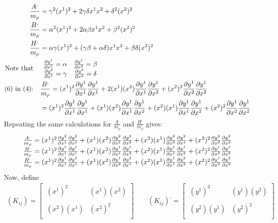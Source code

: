 \begin {align}
\ \frac{A^,}{m_{\rho}}  &= \gamma^2 (x^1)^2+2 \gamma \delta x^1 x^2 + \delta ^2 (x^2)^2\\
\  \frac{B^,}{m_{\rho}}  &= \alpha^2 (x^1)^2+2 \alpha \beta x^1 x^2 + \beta ^2 (x^2)^2\\
\  \frac{H^,}{m_{\rho}}  &= \alpha \gamma (x^1)^2 + (\gamma \beta + \alpha \delta) x^1 x^2 + \beta \delta (x^2)^2\\
\text{Note that} \quad &\begin{array}{cc}
  \pdv{y^1}{x^1} = \alpha & \pdv{y^1}{x^2} = \beta\\ 
	\pdv{y^2}{x^1} = \gamma & \pdv{y^2}{x^2} = \delta\\ 
  \end{array}\\
  \text{(6) in  (4):}\quad &\frac{B^,}{m_{\rho}} =  (x^1)^2\pdv{y^1}{x^1} \pdv{y^1}{x^1}  + 2 (x^1)(x^2)\pdv{y^1}{x^1}\pdv{y^1}{x^2} + (x^2)^2\pdv{y^1}{x^2}\pdv{y^1}{x^2}\\
  &=  (x^1)^2\pdv{y^1}{x^1} \pdv{y^1}{x^1}  +  (x^1)(x^2)\pdv{y^1}{x^1}\pdv{y^1}{x^2} + (x^2)(x^1)\pdv{y^1}{x^1}\pdv{y^1}{x^2} + (x^2)^2\pdv{y^1}{x^2}\pdv{y^1}{x^2}
\end{align}
Repeating the same calculations for $\frac{A^,}{m_{\rho}}$ and $\frac{H^,}{m_{\rho}} $ gives:
\begin {align}
\begin{array}{c}
\frac{A^,}{m_{\rho}} =  (x^1)^2\pdv{y^2}{x^1} \pdv{y^2}{x^1}  +  (x^1)(x^2)\pdv{y^2}{x^1}\pdv{y^2}{x^2} + (x^2)(x^1)\pdv{y^2}{x^2}\pdv{y^2}{x^1} + (x^2)^2\pdv{y^2}{x^2}\pdv{y^2}{x^2}\\
\frac{B^,}{m_{\rho}} =  (x^1)^2\pdv{y^1}{x^1} \pdv{y^1}{x^1}  +  (x^1)(x^2)\pdv{y^1}{x^1}\pdv{y^1}{x^2} + (x^2)(x^1)\pdv{y^1}{x^1}\pdv{y^1}{x^2} + (x^2)^2\pdv{y^1}{x^2}\pdv{y^1}{x^2}\\
\frac{H^,}{m_{\rho}} =  (x^1)^2\pdv{y^1}{x^1} \pdv{y^2}{x^1}  +  (x^1)(x^2)\pdv{y^1}{x^2}\pdv{y^2}{x^1} + (x^2)(x^1)\pdv{y^1}{x^1}\pdv{y^2}{x^2} + (x^2)^2\pdv{y^1}{x^2}\pdv{y^2}{x^2}
  \end{array}
\end{align}
Now, define 
\begin{align}
(K_{ij}) = \left[ { \begin{array}{cc}
  \ (x^1)^2 &  (x^1)(x^2)\\\\
  \ (x^2)(x^1)  & (x^2)^2\\
  \end{array}} \right] \quad \quad (K_{ij})^{,} = \left[ { \begin{array}{cc}
  \ (y^1)^2 &  (y^1)(y^2)\\\\
  \ (y^2)(y^1)  & (y^2)^2\\
  \end{array}} \right]
\end{align}
